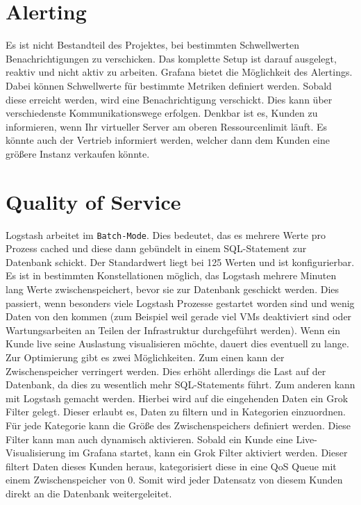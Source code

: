 \section{Alerting}
Es ist nicht Bestandteil des Projektes, bei bestimmten Schwellwerten
Benachrichtigungen zu verschicken. Das komplette Setup ist darauf ausgelegt,
reaktiv und nicht aktiv zu arbeiten. Grafana bietet die Möglichkeit des
Alertings. Dabei können Schwellwerte für bestimmte Metriken definiert werden.
Sobald diese erreicht werden, wird eine Benachrichtigung verschickt. Dies kann
über verschiedenste Kommunikationswege erfolgen. Denkbar ist es, Kunden zu
informieren, wenn Ihr virtueller Server am oberen Ressourcenlimit läuft. Es
könnte auch der Vertrieb informiert werden, welcher dann dem Kunden eine
größere Instanz verkaufen könnte.
\tm%

\section{Quality of Service}
Logstash arbeitet im \texttt{Batch-Mode}. Dies bedeutet, das es mehrere Werte
pro Prozess cached und diese dann gebündelt in einem
\gls{SQL}\hyp{}\gls{Statement} zur Datenbank schickt. Der Standardwert liegt
bei 125 Werten und ist konfigurierbar. Es ist in bestimmten Konstellationen
möglich, das Logstash mehrere Minuten lang Werte zwischenspeichert, bevor sie
zur Datenbank geschickt werden. Dies passiert, wenn besonders viele Logstash
Prozesse gestartet worden sind und wenig Daten von den
 kommen (zum Beispiel weil gerade viel VMs
deaktiviert sind oder Wartungsarbeiten an Teilen der Infrastruktur durchgeführt
werden). Wenn ein Kunde live seine Auslastung visualisieren möchte, dauert dies
eventuell zu lange. Zur Optimierung gibt es zwei Möglichkeiten. Zum einen kann
der Zwischenspeicher verringert werden. Dies erhöht allerdings die Last auf der
Datenbank, da dies zu wesentlich mehr \gls{SQL}\hyp{}Statements führt. Zum
anderen kann mit Logstash  gemacht werden.
Hierbei wird auf die eingehenden Daten ein \gls{Grok} Filter gelegt. Dieser
erlaubt es, Daten zu filtern und in Kategorien einzuordnen. Für jede Kategorie
kann die Größe des Zwischenspeichers definiert werden. Diese Filter kann man
auch dynamisch aktivieren. Sobald ein Kunde eine Live\hyp{}Visualisierung im
Grafana startet, kann ein \gls{Grok} Filter aktiviert werden. Dieser filtert
Daten dieses Kunden heraus, kategorisiert diese in eine QoS Queue mit einem
Zwischenspeicher von 0. Somit wird jeder Datensatz von diesem Kunden direkt an
die Datenbank weitergeleitet.
\tm%

